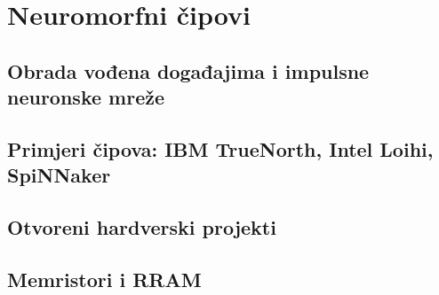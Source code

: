 \section{Neuromorfni čipovi}

\subsection{Obrada vođena događajima i impulsne neuronske mreže}

\subsection{Primjeri čipova: IBM TrueNorth, Intel Loihi, SpiNNaker}

\subsection{Otvoreni hardverski projekti}

\subsection{Memristori i RRAM}
